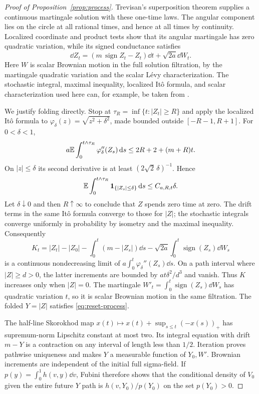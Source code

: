\begin{proof}[Proof of Proposition~\ref{prop:process}]
Trevisan's superposition theorem \cite[Definition 2.2,
condition (4), and Theorem 2.5]{Trevisan15} supplies a continuous
martingale solution with these one-time laws. The angular
component lies on the circle at all rational times, and hence
at all times by continuity. Localized coordinate and product
tests show that its angular martingale has zero quadratic
variation, while its signed conductance satisfies
\begin{equation}\label{eq:signed-conductance}
 \dd Z_t=(m\,\operatorname{sign}Z_t-Z_t)\dd t+\sqrt{2a}\dd W_t .
\end{equation}
Here $W$ is scalar Brownian motion in the full solution
filtration, by the martingale quadratic variation and the scalar
L\'evy characterization. The stochastic integral, maximal
inequality, localized It\^o formula, and scalar characterization
used here can, for example, be taken from
\cite[Theorems 2.32, 4.10, 4.17, 4.19--4.20 and the scalar case
of Theorem 5.11]{DeVecchi22}.

We justify folding directly. Stop at
$\tau_R=\inf\{t:|Z_t|\ge R\}$ and apply the localized It\^o formula
to $\varphi_\delta(z)=\sqrt{z^2+\delta^2}$, made bounded outside
$[-R-1,R+1]$. For $0<\delta<1$,
\[
 a\mathbb E\int_0^{t\wedge\tau_R}\varphi_\delta''(Z_s)\,\mathrm d s
       \le2R+2+(m+R)t .
\]
On $|z|\le\delta$ its second derivative is at least
$(2\sqrt2\,\delta)^{-1}$. Hence
\[
 \mathbb E\int_0^{t\wedge\tau_R}\mathbf 1_{\{|Z_s|\le\delta\}}\,\mathrm d s
       \le C_{a,R,t}\delta .
\]
Let $\delta\downarrow0$ and then $R\uparrow\infty$ to conclude
that $Z$ spends zero time at zero. The drift terms in the
same It\^o formula converge to those for $|Z|$; the stochastic
integrals converge uniformly in probability by isometry and
the maximal inequality. Consequently
\[
 K_t=|Z_t|-|Z_0|-\int_0^t(m-|Z_s|)\dd s
       -\sqrt{2a}\int_0^t\operatorname{sign}(Z_s)\dd W_s
\]
is a continuous nondecreasing limit of
$a\int_0^t\varphi_\delta''(Z_s)\dd s$.
On a path interval where $|Z|\ge d>0$, the latter increments
are bounded by $at\delta^2/d^3$ and vanish. Thus $K$ increases
only when $|Z|=0$. The martingale
$W'_t=\int_0^t\operatorname{sign}(Z_s)\dd W_s$ has quadratic
variation $t$, so it is scalar Brownian motion in the same
filtration. The folded $Y=|Z|$ satisfies
\eqref{eq:reset-process}.

The half-line Skorokhod map
$x(t)\mapsto x(t)+\sup_{s\le t}(-x(s))_+$
has supremum-norm Lipschitz constant at most two. Its integral
equation with drift $m-Y$ is a contraction on any interval of
length less than $1/2$. Iteration proves pathwise uniqueness
and makes $Y$ a measurable function of $Y_0,W'$. Brownian
increments are independent of the initial full sigma-field.
If $p(y)=\int_0^1h(v,y)\dd v$, Fubini therefore shows that the
conditional density of $V_0$ given the entire future $Y$ path
is $h(v,Y_0)/p(Y_0)$ on the set $p(Y_0)>0$.


\end{proof}
